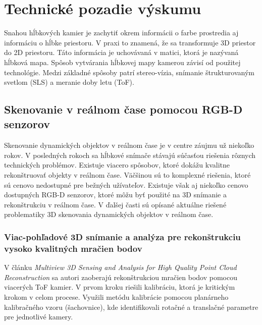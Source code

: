 
\chapter{Technické pozadie výskumu} 
\label{kap:technické_pozadie}
\pagestyle{fancy}
\fancyhf{}
\fancyfoot[CE,CO]{\thepage}
\renewcommand{\footrulewidth}{1pt}

Snahou hĺbkových kamier je zachytiť okrem informácii o farbe prostredia aj informáciu o hĺbke priestoru. V praxi to znamená, že sa transformuje 3D priestor do 2D priestoru. Táto informácia je uchovávaná v matici, ktorá je nazývaná hĺbková mapa. Spôsob vytvárania hĺbkovej mapy kamerou závisí od použitej technológie. Medzi základné spôsoby patrí stereo-vízia, snímanie štrukturovaným svetlom (SLS) a meranie doby letu (ToF).

\section{Skenovanie v reálnom čase pomocou \mbox{RGB-D} senzorov}

Skenovanie dynamických objektov v reálnom čase je v centre záujmu už niekoľko rokov. V posledných rokoch sa hĺbkové snímače stávajú súčasťou riešenia rôznych technických problémov. Existuje viacero spôsobov, ktoré dokážu kvalitne rekonštruovať objekty v reálnom čase. Väčšinou sú to komplexné riešenia, ktoré sú cenovo nedostupné pre bežných užívateľov. Existuje však aj niekoľko cenovo dostupných RGB-D senzorov, ktoré môžu byť použité na 3D snímanie a rekonštrukciu v reálnom čase. V ďalšej časti sú opísané aktuálne riešené problematiky 3D skenovania dynamických objektov v reálnom čase. 

\newpage
\subsection{Viac-pohľadové 3D snímanie a analýza pre rekonštrukciu vysoko kvalitných mračien bodov}

V článku \textit{Multiview 3D Sensing and Analysis for High Quality Point Cloud Reconstruction} sa autori zaoberajú rekonštrukciou mračien bodov pomocou viacerých ToF kamier. 
V prvom kroku riešili kalibráciu, ktorá je kritickým krokom v celom procese. Využili metódu kalibrácie pomocou planárneho kalibračného vzoru (šachovnice), kde identifikovali rotačné a translačné parametre pre jednotlivé kamery. 

